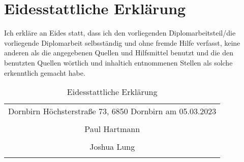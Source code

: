 \section*{Eidesstattliche Erklärung}

Ich erkläre an Eides statt, dass ich den vorliegenden Diplomarbeitsteil/die vorliegende Diplomarbeit selbsständig und ohne fremde Hilfe verfasst, keine anderen als die angegebenen Quellen und Hilfsmittel benutzt und die den benutzten Quellen wörtlich und inhaltich entnommenen Stellen als solche erkenntlich gemacht habe.

\begin{table}[H]
  \centering
  \begin{tabular}{c}
    \\
    Dornbirn Höchsterstraße 73, 6850 Dornbirn am 05.03.2023 \\
    \\ [10ex]

    \hline
    Paul Hartmann                                           \\
    \\ [10ex]

    \hline
    Joshua Lung                                             \\
    \\ [10ex]

              
  \end{tabular}
  \caption{Eidesstattliche Erklärung}
  \label{tab:eidesstaatliche_erklärung}
\end{table}